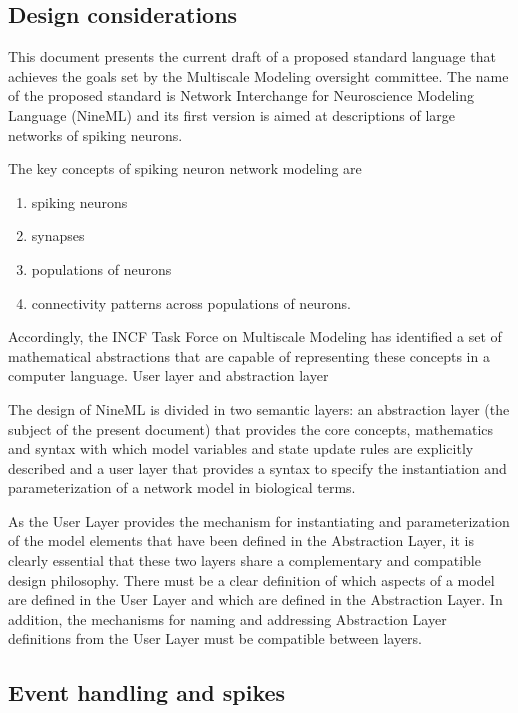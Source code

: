 \documentclass[a4paper]{article}
\begin{document}
\subsection{Design considerations}

This document presents the current draft of a proposed standard
language that achieves the goals set by the Multiscale Modeling
oversight committee. The name of the proposed standard is Network
Interchange for Neuroscience Modeling Language (NineML) and its first
version is aimed at descriptions of large networks of spiking neurons.

The key concepts of spiking neuron network modeling are 

\begin{enumerate}
\item spiking neurons
\item synapses 
\item populations of neurons 
\item connectivity patterns across populations of neurons. 
\end{enumerate}

Accordingly, the INCF Task Force on Multiscale Modeling has identified
a set of mathematical abstractions that are capable of representing
these concepts in a computer language.  User layer and abstraction
layer

The design of NineML is divided in two semantic layers: an abstraction
layer (the subject of the present document) that provides the core
concepts, mathematics and syntax with which model variables and state
update rules are explicitly described and a user layer that provides a
syntax to specify the instantiation and parameterization of a network
model in biological terms.

As the User Layer provides the mechanism for instantiating and
parameterization of the model elements that have been defined in the
Abstraction Layer, it is clearly essential that these two layers share
a complementary and compatible design philosophy. There must be a
clear definition of which aspects of a model are defined in the User
Layer and which are defined in the Abstraction Layer. In addition, the
mechanisms for naming and addressing Abstraction Layer definitions
from the User Layer must be compatible between layers.


\subsection{Event handling and spikes}
\end{document}
